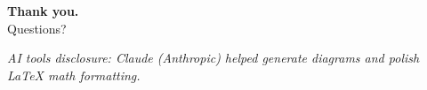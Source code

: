 \documentclass[11pt,aspectratio=169]{beamer}
\begin{document}
\begin{frame}[plain]
\vspace*{\fill}
\begin{center}
{\Huge\textbf{Thank you.}}\\[18pt]
{\LARGE Questions?}
\end{center}
\vspace*{\fill}
\begin{center}
\textcolor{cgray}{\scriptsize\textit{AI tools disclosure: Claude (Anthropic) helped generate diagrams and polish \LaTeX{} math formatting.}}
\end{center}
\end{frame}
\end{document}
